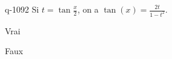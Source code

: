 \begin{truefalse}{q-1092}
Si $t=\tan\frac{x}{2}$, on a $\tan(x)=\frac{2t}{1-t^2}$.
\item* Vrai
\item Faux
\end{truefalse}

